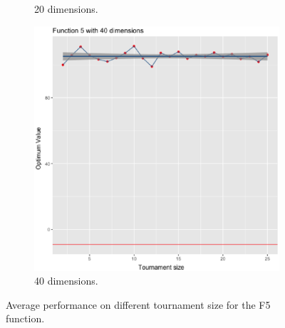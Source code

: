 \begin{figure}[t]
\begin{subfigure}[b]{0.33\textwidth}
		\caption{20 dimensions.}
	\end{subfigure}
	\begin{subfigure}[b]{0.33\textwidth}
		\centering
		\includegraphics[width=\textwidth]{img/5dim_40.ps}
		\caption{40 dimensions.}
	\end{subfigure}
	\caption{Average performance on different tournament size for the F5 function.}
	\label{5}
\end{figure}

